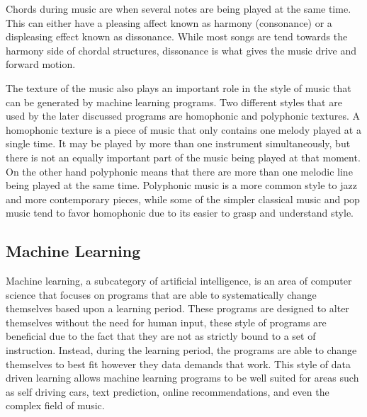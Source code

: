 \documentclass{sig-alternate}
\begin{document}
Chords during music are when several notes are being played at the same time. This can either have a pleasing affect known as harmony (consonance) or a displeasing effect known as dissonance. While most songs are tend towards the harmony side of chordal structures, dissonance is what gives the music drive and forward motion.

The texture of the music also plays an important role in the style of music that can be generated by machine learning programs. Two different styles that are used by the later discussed programs are homophonic and polyphonic textures. A homophonic texture is a piece of music that only contains one melody played at a single time. It may be played by more than one instrument simultaneously, but there is not an equally important part of the music being played at that moment. On the other hand polyphonic means that there are more than one melodic line being played at the same time. Polyphonic music is a more common style to jazz and more contemporary pieces, while some of the simpler classical music and pop music tend to favor homophonic due to its easier to grasp and understand style.

\subsection{Machine Learning}
\label{sec:machinelearning}
	Machine learning, a subcategory of artificial intelligence, is an area of computer science that focuses on programs that are able to systematically change themselves based upon a learning period. These programs are designed to alter themselves without the need for human input, these style of programs are beneficial due to the fact that they are not as strictly bound to a set of instruction. Instead, during the learning period, the programs are able to change themselves to best fit however they data demands that work. This style of data driven learning allows machine learning programs to be well suited for areas such as self driving cars, text prediction, online recommendations, and even the complex field of music.
\end{document}
